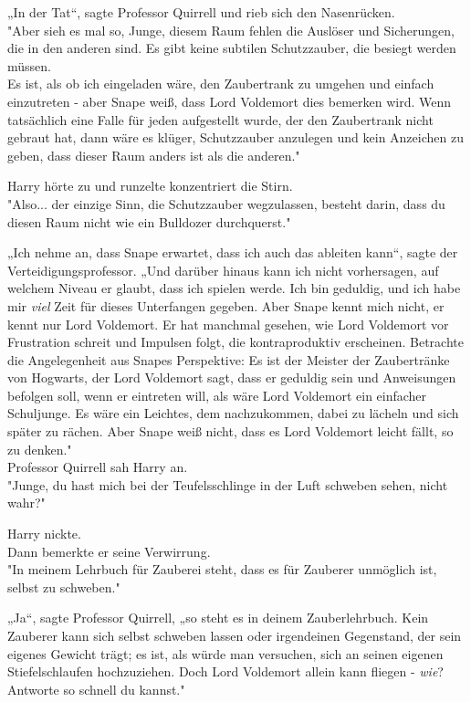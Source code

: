 {„In der Tat“, sagte Professor Quirrell und rieb sich den Nasenrücken.\\ "Aber sieh es mal so, Junge, diesem Raum fehlen die Auslöser und Sicherungen, die in den anderen sind. Es gibt keine subtilen Schutzzauber, die besiegt werden müssen.\\ Es ist, als ob ich eingeladen wäre, den Zaubertrank zu umgehen und einfach einzutreten - aber Snape weiß, dass Lord Voldemort dies bemerken wird. Wenn tatsächlich eine Falle für jeden aufgestellt wurde, der den Zaubertrank nicht gebraut hat, dann wäre es klüger, Schutzzauber anzulegen und kein Anzeichen zu geben, dass dieser Raum anders ist als die anderen."

Harry hörte zu und runzelte konzentriert die Stirn.\\ "Also... der einzige Sinn, die Schutzzauber wegzulassen, besteht darin, dass du diesen Raum nicht wie ein Bulldozer durchquerst."

„Ich nehme an, dass Snape erwartet, dass ich auch das ableiten kann“, sagte der Verteidigungsprofessor. „Und darüber hinaus kann ich nicht vorhersagen, auf welchem Niveau er glaubt, dass ich spielen werde. Ich bin geduldig, und ich habe mir \emph{viel} Zeit für dieses Unterfangen gegeben. Aber Snape kennt mich nicht, er kennt nur Lord Voldemort. Er hat manchmal gesehen, wie Lord Voldemort vor Frustration schreit und Impulsen folgt, die kontraproduktiv erscheinen. Betrachte die Angelegenheit aus Snapes Perspektive: Es ist der Meister der Zaubertränke von Hogwarts, der Lord Voldemort sagt, dass er geduldig sein und Anweisungen befolgen soll, wenn er eintreten will, als wäre Lord Voldemort ein einfacher Schuljunge. Es wäre ein Leichtes, dem nachzukommen, dabei zu lächeln und sich später zu rächen. Aber Snape weiß nicht, dass es Lord Voldemort leicht fällt, so zu denken."\\ Professor Quirrell sah Harry an.\\ "Junge, du hast mich bei der Teufelsschlinge in der Luft schweben sehen, nicht wahr?"

Harry nickte.\\ Dann bemerkte er seine Verwirrung.\\ "In meinem Lehrbuch für Zauberei steht, dass es für Zauberer unmöglich ist, selbst zu schweben."

„Ja“, sagte Professor Quirrell, „so steht es in deinem Zauberlehrbuch. Kein Zauberer kann sich selbst schweben lassen oder irgendeinen Gegenstand, der sein eigenes Gewicht trägt; es ist, als würde man versuchen, sich an seinen eigenen Stiefelschlaufen hochzuziehen. Doch Lord Voldemort allein kann fliegen - \emph{wie}? Antworte so schnell du kannst."

}
